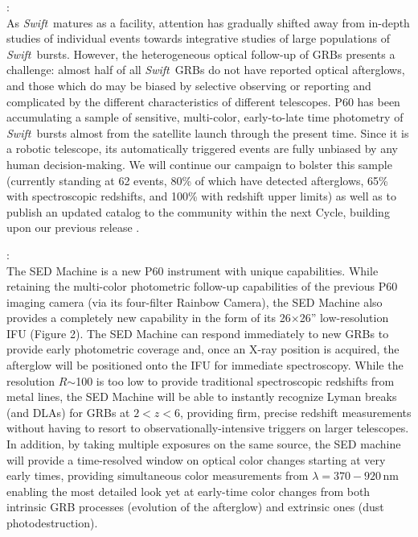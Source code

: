\documentclass[letterpaper,11pt]{article}
\newcommand{\swift}{\textit{Swift}}
\begin{document}
\noindent {\it C) Population Statistics for \swift\ GRBs}:
\smallskip\\
As \swift\ matures as a facility, attention has gradually shifted away from in-depth 
studies of individual events towards integrative studies of large populations of 
\swift\ bursts.  However, the heterogeneous optical follow-up of GRBs presents a challenge: 
almost half of all \swift\ GRBs do not have reported optical afterglows, and those which do 
may be biased by selective observing or reporting and complicated by the different characteristics of different telescopes.  
P60 has been accumulating a sample of sensitive, multi-color, early-to-late time 
photometry of \swift\ bursts almost from the satellite launch through the present time.
Since it is a robotic telescope, its automatically triggered events are fully unbiased by
any human decision-making.  We will continue our campaign to bolster this sample
(currently standing at 62 events, 80\% of which have detected afterglows, 65\% with
spectroscopic redshifts, and 100\% with redshift upper limits) as well as to publish an 
updated catalog to the community within the next Cycle, building upon our previous 
release \citep{ckh+09,pcb+09}.

:
\smallskip\\
The SED Machine is a new P60 instrument with unique capabilities.  
While retaining the multi-color photometric follow-up capabilities of 
the previous P60 imaging camera (via its four-filter Rainbow Camera), the 
SED Machine also provides a completely new capability in the form of its 
26$\times$26'' low-resolution IFU (Figure 2).  The SED Machine can respond 
immediately to new GRBs to provide early photometric coverage and, once an X-ray 
position is acquired, the afterglow will be positioned onto the IFU for 
immediate spectroscopy.  While the resolution $R$$\sim$100 is too low to 
provide traditional spectroscopic redshifts from metal lines, the SED Machine 
will be able to instantly recognize Lyman breaks (and DLAs) for GRBs at $2 < z < 6$, 
providing firm, precise redshift measurements without having to resort to 
observationally-intensive triggers on larger telescopes.  In addition, by taking 
multiple exposures on the same source, the SED machine will provide a time-resolved 
window on optical color changes starting at very early times, providing 
simultaneous color measurements from $\lambda=370-920$\,nm enabling the most 
detailed look yet at early-time color changes from both intrinsic GRB processes 
(evolution of the afterglow) and extrinsic ones (dust photodestruction). \\
\end{document}
